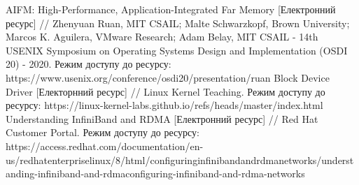 AIFM: High-Performance, Application-Integrated Far Memory [Електронний ресурс] // Zhenyuan Ruan, MIT CSAIL; Malte Schwarzkopf, Brown University; Marcos K. Aguilera, VMware Research; Adam Belay, MIT CSAIL - 14th USENIX Symposium on Operating Systems Design and Implementation (OSDI 20) - 2020. Режим доступу до ресурсу: https://www.usenix.org/conference/osdi20/presentation/ruan
Block Device Driver [Електорнний ресурс] // Linux Kernel Teaching. Режим доступу до ресурсу: https://linux-kernel-labs.github.io/refs/heads/master/index.html
Understanding InfiniBand and RDMA [Електронний ресурс] // Red Hat Customer Portal. Режим доступу до ресурсу: https://access.redhat.com/documentation/en-us/red\textunderscore hat\textunderscore enterprise\textunderscore linux/8/html/configuring\textunderscore infiniband\textunderscore and\textunderscore rdma\textunderscore networks/understanding-infiniband-and-rdma\textunderscore configuring-infiniband-and-rdma-networks
